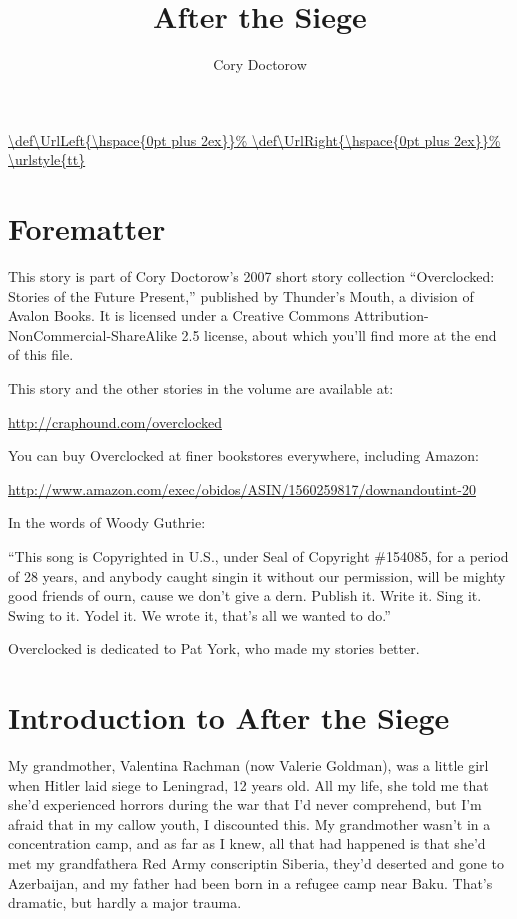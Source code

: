 \newcommand{\heading}{\chapter*}

\usepackage{url}
\DeclareUrlCommand\url{\def\UrlLeft{\hspace{0pt plus 2ex}}%
        \def\UrlRight{\hspace{0pt plus 2ex}}%
        \urlstyle{tt}}




\title{After the Siege}
\author{Cory Doctorow}
\date{}
\maketitle

\heading{Forematter}
\begin{flushleft}
\setlength{\parskip}{0.7\baselineskip plus 0.3\baselineskip}
This story is part of Cory Doctorow’s 2007 short story collection
“Overclocked: Stories of the Future Present,” published by
Thunder’s Mouth, a division of Avalon Books. It is licensed under a
Creative Commons Attribution-NonCommercial-ShareAlike 2.5 license,
about which you’ll find more at the end of this file.

This story and the other stories in the volume are available at:

\url{http://craphound.com/overclocked}

You can buy Overclocked at finer bookstores everywhere, including
Amazon:

\url{http://www.amazon.com/exec/obidos/ASIN/1560259817/downandoutint-20}

In the words of Woody Guthrie:

“This song is Copyrighted in U.S., under Seal of Copyright
\#154085, for a period of 28 years, and anybody caught singin it
without our permission, will be mighty good friends of ourn, cause
we don’t give a dern. Publish it. Write it. Sing it. Swing to it.
Yodel it. We wrote it, that’s all we wanted to do.”

Overclocked is dedicated to Pat York, who made my stories better.
\end{flushleft}

\heading{Introduction to After the Siege}

My grandmother, Valentina Rachman (now Valerie Goldman), was a
little girl when Hitler laid siege to Leningrad, 12 years old. All
my life, she told me that she’d experienced horrors during the war
that I’d never comprehend, but I’m afraid that in my callow youth,
I discounted this. My grandmother wasn’t in a concentration camp,
and as far as I knew, all that had happened is that she’d met my
grandfather\dash{}a Red Army conscript\dash{}in Siberia, they’d deserted and
gone to Azerbaijan, and my father had been born in a refugee camp
near Baku. That’s dramatic, but hardly a major trauma.

